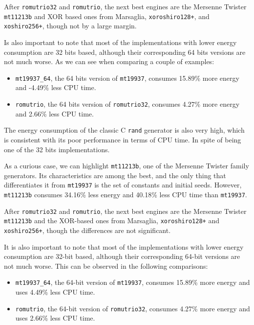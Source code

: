 \documentclass[sigconf]{acmart}
\begin{document}
After \texttt{romutrio32} and \texttt{romutrio}, the next best engines are the Mersenne Twister \texttt{mt11213b} and XOR based ones from Marsaglia, \texttt{xoroshiro128+}, and \texttt{xoshiro256+}, though not by a large margin.

Is also important to note that most of the implementations with lower energy consumption are 32 bits based, although their corresponding 64 bits versions are not much worse. As we can see when comparing a couple of examples:
\begin{itemize}
\item \texttt{mt19937\_64}, the 64 bits version of \texttt{mt19937}, consumes 15.89\% more energy and -4.49\% less CPU time.
\item \texttt{romutrio}, the 64 bits version of \texttt{romutrio32}, consumes 4.27\% more energy and 2.66\% less CPU time.
\end{itemize}

The energy consumption of the classic C \texttt{rand} generator is also very high, which is consistent with its poor performance in terms of CPU time. In spite of being one of the 32 bits implementations.

As a curious case, we can highlight \texttt{mt11213b}, one of the Mersenne Twister family generators. Its characteristics are among the best, and the only thing that differentiates it from \texttt{mt19937} is the set of constants and initial seeds. However, \texttt{mt11213b} consumes 34.16\% less energy and 40.18\% less CPU time than \texttt{mt19937}.

After \texttt{romutrio32} and \texttt{romutrio}, the next best engines are the Mersenne Twister \texttt{mt11213b} and the XOR-based ones from Marsaglia, \texttt{xoroshiro128+} and \texttt{xoshiro256+}, though the differences are not significant.

It is also important to note that most of the implementations with lower energy consumption are 32-bit based, although their corresponding 64-bit versions are not much worse. This can be observed in the following comparisons:

\begin{itemize}
    \item \texttt{mt19937\_64}, the 64-bit version of \texttt{mt19937}, consumes 15.89\% more energy and uses 4.49\% less CPU time.
    \item \texttt{romutrio}, the 64-bit version of \texttt{romutrio32}, consumes 4.27\% more energy and uses 2.66\% less CPU time.
\end{itemize}
\end{document}
